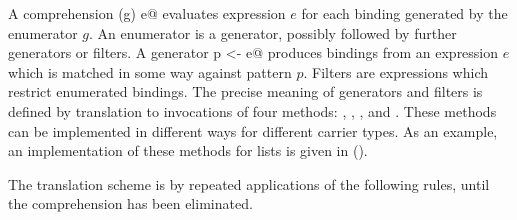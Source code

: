 \documentclass[11pt]{report}
\begin{document}
A comprehension \verb@for (g) e@ evaluates expression $e$ for each
binding generated by the enumerator $g$. An enumerator is a generator,
possibly followed by further generators or filters.  A generator
\verb@val p <- e@ produces bindings from an expression $e$ which is
matched in some way against pattern $p$. Filters are expressions which
restrict enumerated bindings. The precise meaning of generators and
filters is defined by translation to invocations of four methods:
\verb@map@, \verb@filter@, \verb@flatMap@, and \verb@foreach@. These
methods can be implemented in different ways for different carrier
types.  As an example, an implementation of these methods for lists is
given in ().

The translation scheme is by repeated applications of the following
rules, until the comprehension has been eliminated.
\end{document}
